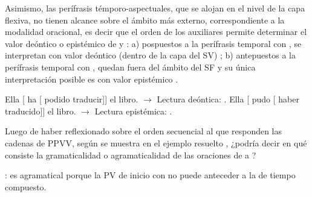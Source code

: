 \begin{recuadro}
Asimismo, las perífrasis témporo-aspectuales, que se alojan en el nivel de la
capa flexiva, no tienen alcance sobre el ámbito más externo, correspondiente a la
modalidad oracional, es decir que el orden de los auxiliares permite determinar
el valor deóntico o epistémico de  y : a) pospuestos a
la perífrasis temporal con , se interpretan con valor deóntico
(dentro de la capa del SV) ; b) antepuestos a la
perífrasis temporal con , quedan fuera del ámbito del SF y su única
interpretación posible es con valor epistémico .

\begin{exe}
  \ex\label{ex:11-ha-podido} Ella [ ha [ podido traducir]]
      el libro. $\rightarrow$ Lectura deóntica: .
  \ex\label{ex:11-pudo-haber} Ella [ pudo [ haber traducido]]
      el libro. $\rightarrow$ Lectura epistémica: .
\end{exe}
\end{recuadro}

\begin{ejercicio}\label{ej:11-orden}
Luego de haber reflexionado sobre el orden secuencial al que responden las
cadenas de PPVV, según se muestra en el ejemplo resuelto ,
¿podría decir en qué consiste la gramaticalidad o agramaticalidad de las
oraciones de  a ?

\begin{resuelto}
: es agramatical porque la PV de inicio con
 no puede anteceder a la de tiempo compuesto.
\end{resuelto}
\end{ejercicio}

